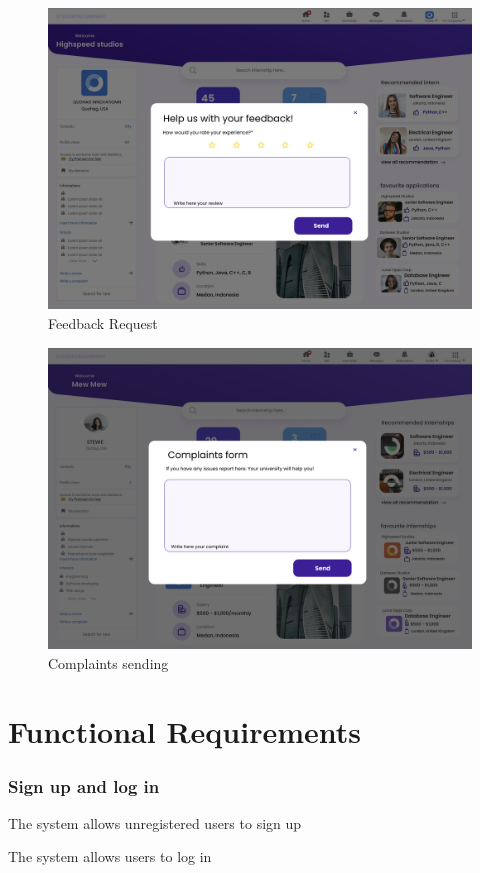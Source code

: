 \begin{figure} [H]
    \centering
    \includegraphics[width=0.5\linewidth]{Interface Images/user interface/Screenshot 2024-12-12 045929.png}
    \caption{Feedback Request}
    \label{fig:Feedback Request}
\end{figure}

\begin{figure} [H]
    \centering
    \includegraphics[width=0.5\linewidth]{Interface Images/user interface/Screenshot 2024-12-12 045947.png}
    \caption{Complaints sending}
    \label{fig: Complaints sending}
\end{figure}

\newpage
\section{Functional Requirements}

\subsubsection*{Sign up and log in}
\begin{enumerate}[label={\textbf{[R\arabic*]}}, leftmargin=1.35cm]
    \item The system allows unregistered users to sign up
    \item The system allows users to log in
\end{enumerate}

